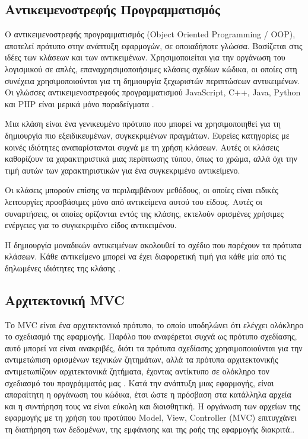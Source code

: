 \subsection{Αντικειμενοστρεφής Προγραμματισμός}
Ο αντικειμενοστρεφής προγραμματισμός (Object Oriented Programming / OOP), αποτελεί πρότυπο στην ανάπτυξη εφαρμογών, σε οποιαδήποτε γλώσσα. Βασίζεται στις ιδέες των κλάσεων και των αντικειμένων. Χρησιμοποιείται για την οργάνωση του λογισμικού σε απλές, επαναχρησιμοποιήσιμες κλάσεις σχεδίων κώδικα, οι οποίες στη συνέχεια χρησιμοποιούνται για τη δημιουργία ξεχωριστών περιπτώσεων αντικειμένων. Οι γλώσσες αντικειμενοστρεφούς προγραμματισμού JavaScript, C++, Java, Python και PHP είναι μερικά μόνο παραδείγματα \cite{smith2011object}.

Μια κλάση είναι ένα γενικευμένο πρότυπο που μπορεί να χρησιμοποιηθεί για τη δημιουργία πιο εξειδικευμένων, συγκεκριμένων πραγμάτων. Ευρείες κατηγορίες με κοινές ιδιότητες αναπαρίστανται συχνά με τη χρήση κλάσεων. Αυτές οι κλάσεις καθορίζουν τα χαρακτηριστικά μιας περίπτωσης τύπου, όπως το χρώμα, αλλά όχι την τιμή αυτών των χαρακτηριστικών για ένα συγκεκριμένο αντικείμενο.

Οι κλάσεις μπορούν επίσης να περιλαμβάνουν μεθόδους, οι οποίες είναι ειδικές λειτουργίες προσβάσιμες μόνο από αντικείμενα αυτού του είδους. Αυτές οι συναρτήσεις, οι οποίες ορίζονται εντός της κλάσης, εκτελούν ορισμένες χρήσιμες ενέργειες για το συγκεκριμένο είδος αντικειμένου.

Η δημιουργία μοναδικών αντικειμένων ακολουθεί το σχέδιο που παρέχουν τα πρότυπα κλάσεων. Κάθε αντικείμενο μπορεί να έχει διαφορετική τιμή για κάθε μία από τις δηλωμένες ιδιότητες της κλάσης \cite{Doherty_2020}.


\subsection{Αρχιτεκτονική MVC}
Το MVC είναι ένα αρχιτεκτονικό πρότυπο, το οποίο υποδηλώνει ότι ελέγχει ολόκληρο το σχεδιασμό της εφαρμογής. Παρόλο που αναφέρεται συχνά ως πρότυπο σχεδίασης, αυτό μπορεί να είναι ανακριβές, διότι τα πρότυπα σχεδίασης χρησιμοποιούνται για την αντιμετώπιση ορισμένων τεχνικών ζητημάτων, αλλά τα πρότυπα αρχιτεκτονικής αντιμετωπίζουν αρχιτεκτονικά ζητήματα, έχοντας αντίκτυπο σε ολόκληρο τον σχεδιασμό του προγράμματός μας \cite{Svirca_2020}. Κατά την ανάπτυξη μιας εφαρμογής, είναι απαραίτητη η οργάνωση του κώδικα, έτσι ώστε η πρόσβαση στα κατάλληλα αρχεία και η συντήρηση τους να είναι εύκολη και διαισθητική. Η οργάνωση των αρχείων της εφαρμογής με τη χρήση του προτύπου Model, View, Controller (MVC) επιτυγχάνει τη διατήρηση των δεδομένων, της εμφάνισης και της ροής της εφαρμογής διακριτά.\cite{CodeIgniter_mvc}.

